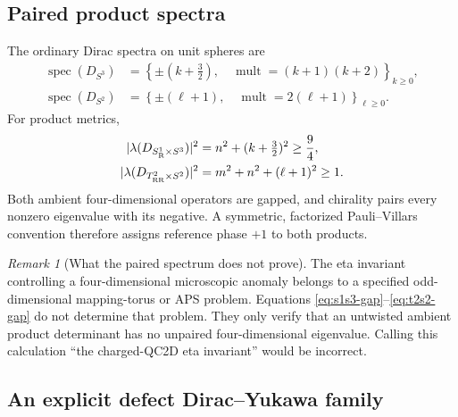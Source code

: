 \documentclass[11pt]{article}
\theoremstyle{definition}
\theoremstyle{remark}
\newtheorem{remark}[theorem]{Remark}
\begin{document}
\subsection{Paired product spectra}

The ordinary Dirac spectra on unit spheres are
\begin{align}
 \operatorname{spec}(D_{S^3})
 &=\left\{\pm(k+\tfrac32),\quad
   \operatorname{mult}=(k+1)(k+2)\right\}_{k\ge0},
 \label{eq:s3-spectrum}\\
 \operatorname{spec}(D_{S^2})
 &=\left\{\pm(\ell+1),\quad
   \operatorname{mult}=2(\ell+1)\right\}_{\ell\ge0}.
 \label{eq:s2-spectrum}
\end{align}
For product metrics,
\begin{align}
 |\lambda(D_{S^1_{\rm R}\times S^3})|^2
 &=n^2+(k+\tfrac32)^2\ge\frac94,
 \label{eq:s1s3-gap}\\
 |\lambda(D_{T^2_{\rm RR}\times S^2})|^2
 &=m^2+n^2+(\ell+1)^2\ge1.
 \label{eq:t2s2-gap}
\end{align}
Both ambient four-dimensional operators are gapped, and chirality pairs
every nonzero eigenvalue with its negative.  A symmetric, factorized
Pauli--Villars convention therefore assigns reference phase \(+1\) to both
products.

\begin{remark}[What the paired spectrum does not prove]
The eta invariant controlling a four-dimensional microscopic anomaly belongs
to a specified odd-dimensional mapping-torus or APS problem.  Equations
\eqref{eq:s1s3-gap}--\eqref{eq:t2s2-gap} do not determine that problem.  They
only verify that an untwisted ambient product determinant has no unpaired
four-dimensional eigenvalue.  Calling this calculation ``the charged-QC2D
eta invariant'' would be incorrect.
\end{remark}

\subsection{An explicit defect Dirac--Yukawa family}
\end{document}
